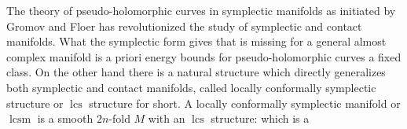 \documentclass{amsart}
\numberwithin{equation}{section}
\newtheorem{definition}[equation]{Definition}
\theoremstyle{definition}
\theoremstyle{remark}
\DeclareMathOperator{\lcs}{lcs}
\DeclareMathOperator{\lcsm}{lcsm}
\begin{document}
%
The theory of pseudo-holomorphic curves in symplectic manifolds as initiated by Gromov and Floer has revolutionized the study of symplectic and contact manifolds. What the symplectic form gives that is missing for a general almost complex manifold is a priori energy bounds for pseudo-holomorphic curves a fixed class.
On the other hand there is a natural structure which  directly generalizes both symplectic and contact manifolds, called locally conformally symplectic structure or $\lcs$ structure for short. A locally conformally symplectic manifold or $\lcsm$ is a smooth $2n$-fold $M$ with an $\lcs$ structure: which is a
\end{document}
